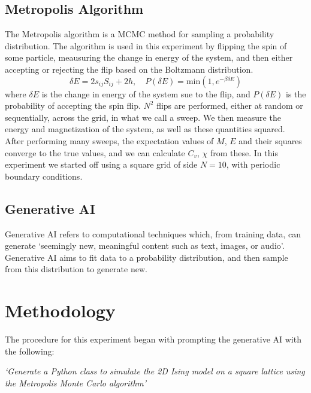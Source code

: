 \documentclass{article}
\theoremstyle{definition}
\theoremstyle{remark}
\begin{document}
\subsection{Metropolis Algorithm}
The Metropolis algorithm is a MCMC method for sampling a probability distribution. The algorithm is used in this experiment by flipping the spin of some particle, meausuring the change in energy of the system, and then either accepting or rejecting the flip based on the Boltzmann distribution.
\begin{equation}
    \label{eq: metropolis}
    \delta E = 2s_{ij}S_{ij} + 2h, \quad P(\delta E) = \mathrm{min}(1, e^{-\beta\delta E})
\end{equation}
where $\delta E$ is the change in energy of the system sue to the flip, and $P(\delta E)$ is the probability of accepting the spin flip. $N^2$ flips are performed, either at random or sequentially, across the grid, in what we call a sweep. We then measure the energy and magnetization of the system, as well as these quantities squared. After performing many sweeps, the expectation values of $M$, $E$ and their squares converge to the true values, and we can calculate $C_v$, $\chi$ from these. In this experiment we started off using a square grid of side $N=10$, with periodic boundary conditions.\\
\subsection{Generative AI}
Generative AI refers to computational techniques which, from training data, can generate `seemingly new,
meaningful content such as text, images, or audio'. Generative AI aims to fit data to a probability distribution, and then sample from this distribution to generate new.
\section{Methodology}
The procedure for this experiment began with prompting the generative AI with the following:\\
\begin{center}
\textit{`Generate a Python class to simulate the 2D Ising model on a square lattice using the Metropolis Monte Carlo algorithm'}\\
\end{center}
\end{document}
